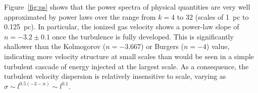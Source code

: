 \documentclass[useAMS,usenatbib]{mn2e}
\newcounter{ionstage} %
\newcommand{\ion}[2]{\setcounter{ionstage}{#2}%
  \ensuremath{\mathrm{#1\,\scriptstyle\Roman{ionstage}}}} %
\newcommand\hii{\ion{H}{2}} %
\providecommand{\DIFdel}[1]{} %
\providecommand{\DIFaddbegin}{\color{red!70!black}} %
\providecommand{\DIFdelbegin}{} %
\providecommand{\DIFdelend}{} %
\begin{document}
Figure~\ref{fig:ps} shows that
the power spectra of physical quantities are very well approximated
by power laws over the range from $k = 4$ to 32
(scales of 1~pc to 0.125~pc).
In particular, the ionized gas velocity shows
a power-law slope of \(n = -3.2 \pm 0.1\)
once the turbulence is fully developed. 
This is significantly shallower than the Kolmogorov (\(n = -3.667\))
or Burgers (\(n = -4\)) value,
indicating more velocity structure at small scales than would be seen
in a simple turbulent cascade of energy injected at the largest scale.
As a consequence,
the turbulent velocity dispersion is relatively insensitive to scale,
varying as \(\sigma \sim l^{0.5 (-3 - n)} \sim l^{0.1}\). 

\DIFdelbegin \DIFdel{One }\DIFdelend %
\DIFaddbegin 
\end{document}
